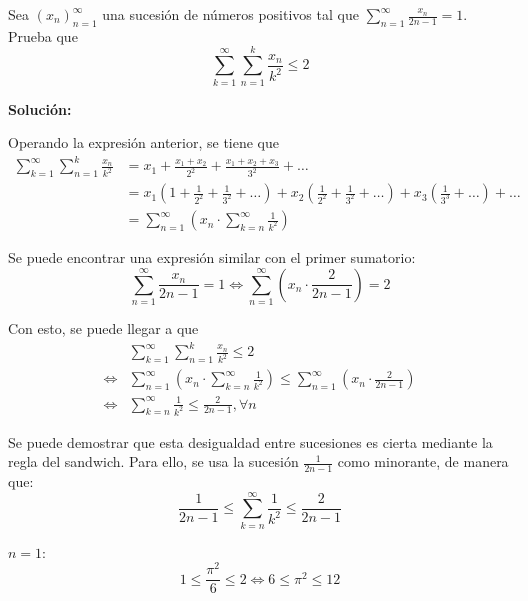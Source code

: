 \documentclass[../../main.tex]{subfiles}
\begin{document}
  \begin{shaded}
    Sea $(x_n)_{n = 1}^\infty$ una sucesión de números positivos tal que $\displaystyle\sum_{n = 1}^\infty \displaystyle\frac{x_n}{2n - 1} = 1$. Prueba que
    $$
    \sum_{k = 1}^\infty \sum_{n = 1}^k \frac{x_n}{k^2} \leq 2
    $$

    \end{shaded}

  \textbf{Solución:}

  Operando la expresión anterior, se tiene que
  \begin{equation*}
    \begin{split}
      \sum_{k = 1}^\infty \sum_{n = 1}^k \frac{x_n}{k^2} & =
      x_1 + \frac{x_1 + x_2}{2^2} + \frac{x_1 + x_2 + x_3}{3^2} + \dots \\ & =
      x_1 \left(1 + \frac{1}{2^2} + \frac{1}{3^2} + \dots \right) + x_2 \left(\frac{1}{2^2} + \frac{1}{3^2} + \dots \right) + x_3 \left(\frac{1}{3^3} + \dots\right) + \dots \\ & =
      \sum_{n = 1}^\infty \left(x_n \cdot \sum_{k = n}^\infty \frac{1}{k^2} \right)
    \end{split}
  \end{equation*}

  Se puede encontrar una expresión similar con el primer sumatorio:
  $$
  \sum_{n = 1}^\infty \frac{x_n}{2n - 1} = 1
  \iff
  \sum_{n = 1}^\infty \left(x_n \cdot \frac{2}{2n -1}\right) = 2
  $$

  Con esto, se puede llegar a que
  \begin{equation*}
    \begin{split}
    & \sum_{k = 1}^\infty \sum_{n = 1}^k \frac{x_n}{k^2} \leq 2 \\ \iff
    & \sum_{n = 1}^\infty \left(x_n \cdot \sum_{k = n}^\infty \frac{1}{k^2} \right) \leq \sum_{n = 1}^\infty \left(x_n \cdot \frac{2}{2n - 1}\right) \\ \iff
    & \sum_{k = n}^\infty \frac{1}{k^2} \leq \frac{2}{2n -1}, \forall n
    \end{split}
  \end{equation*}

  \newpage
  Se puede demostrar que esta desigualdad entre sucesiones es cierta mediante la regla del sandwich. Para ello, se usa la sucesión $\displaystyle\frac{1}{2n - 1}$ como minorante, de manera que:
  $$
  \frac{1}{2n - 1} \leq \sum_{k = n}^\infty \frac{1}{k^2} \leq \frac{2}{2n - 1}
  $$

  $n = 1$:
  $$
  1 \leq \frac{\pi^2}{6} \leq 2
  \iff
  6 \leq \pi^2 \leq 12
  $$
\end{document}
